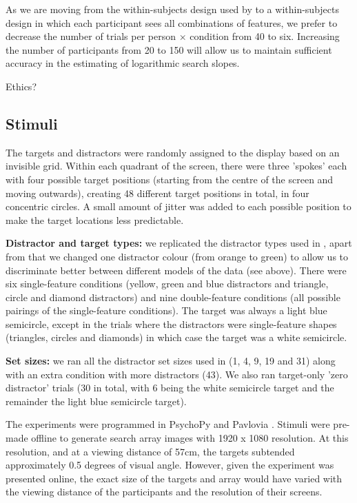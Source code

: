 \documentclass[smallextended, natbib]{svjour3}       %
\begin{document}
As we are moving from the within-subjects design used by \cite{buetti2019predicting} to a within-subjects design in which each participant sees all combinations of features, we prefer to decrease the number of trials per person $\times$ condition from 40 to six. Increasing the number of participants from 20 to 150 will allow us to maintain sufficient accuracy in the estimating of logarithmic search slopes. 

Ethics?

\subsection{Stimuli}

The targets and distractors were randomly assigned to the display based on an invisible grid. Within each quadrant of the screen, there were three 'spokes' each with four possible target positions (starting from the centre of the screen and moving outwards), creating 48 different target positions in total, in four concentric circles. A small amount of jitter was added to each possible position to make the target locations less predictable.

\textbf{Distractor and target types:} we replicated the distractor types used in \cite{buetti2019predicting}, apart from that we changed one distractor colour (from orange to green) to allow us to discriminate better between different models of the data (see above). There were six single-feature conditions (yellow, green and blue distractors and triangle, circle and diamond distractors) and nine double-feature conditions (all possible pairings of the single-feature conditions). The target was always a light blue semicircle, except in the trials where the distractors were single-feature shapes (triangles, circles and diamonds) in which case the target was a white semicircle.

\textbf{Set sizes:} we ran all the distractor set sizes used in \cite{buetti2019predicting} (1, 4, 9, 19 and 31) along with an extra condition with more distractors (43). We also ran target-only 'zero distractor' trials (30 in total, with 6 being the white semicircle target and the remainder the light blue semicircle target).

The experiments were programmed in PsychoPy and Pavlovia \cite{peirce2019psychopy2}. Stimuli were pre-made offline to generate search array images with 1920 x 1080 resolution. At this resolution, and at a viewing distance of 57cm, the targets subtended approximately 0.5 degrees of visual angle. However, given the experiment was presented online, the exact size of the targets and array would have varied with the viewing distance of the participants and the resolution of their screens.
\end{document}
